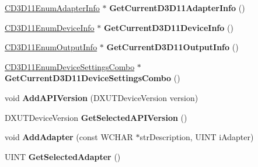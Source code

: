\begin{DoxyCompactItemize}
\item 
\hypertarget{class_c_d3_d_settings_dlg_aa55218dad61ba0dff3180137c9debe5e}{\hyperlink{class_c_d3_d11_enum_adapter_info}{C\+D3\+D11\+Enum\+Adapter\+Info} $\ast$ {\bfseries Get\+Current\+D3\+D11\+Adapter\+Info} ()}\label{class_c_d3_d_settings_dlg_aa55218dad61ba0dff3180137c9debe5e}

\item 
\hypertarget{class_c_d3_d_settings_dlg_a0d7b03493d86c5942b4547979580a557}{\hyperlink{class_c_d3_d11_enum_device_info}{C\+D3\+D11\+Enum\+Device\+Info} $\ast$ {\bfseries Get\+Current\+D3\+D11\+Device\+Info} ()}\label{class_c_d3_d_settings_dlg_a0d7b03493d86c5942b4547979580a557}

\item 
\hypertarget{class_c_d3_d_settings_dlg_a915c73e860d5e7650a37b8248dcb55cd}{\hyperlink{class_c_d3_d11_enum_output_info}{C\+D3\+D11\+Enum\+Output\+Info} $\ast$ {\bfseries Get\+Current\+D3\+D11\+Output\+Info} ()}\label{class_c_d3_d_settings_dlg_a915c73e860d5e7650a37b8248dcb55cd}

\item 
\hypertarget{class_c_d3_d_settings_dlg_a093073dc838cafa734db0293b5ca4283}{\hyperlink{struct_c_d3_d11_enum_device_settings_combo}{C\+D3\+D11\+Enum\+Device\+Settings\+Combo} $\ast$ {\bfseries Get\+Current\+D3\+D11\+Device\+Settings\+Combo} ()}\label{class_c_d3_d_settings_dlg_a093073dc838cafa734db0293b5ca4283}

\item 
\hypertarget{class_c_d3_d_settings_dlg_ab0c7edad9d7414f9cd4da29b4f7a0668}{void {\bfseries Add\+A\+P\+I\+Version} (D\+X\+U\+T\+Device\+Version version)}\label{class_c_d3_d_settings_dlg_ab0c7edad9d7414f9cd4da29b4f7a0668}

\item 
\hypertarget{class_c_d3_d_settings_dlg_a9ad88251ae426f85a48381cdf856b2d4}{D\+X\+U\+T\+Device\+Version {\bfseries Get\+Selected\+A\+P\+I\+Version} ()}\label{class_c_d3_d_settings_dlg_a9ad88251ae426f85a48381cdf856b2d4}

\item 
\hypertarget{class_c_d3_d_settings_dlg_af6f11fa22d6c9855beec1de19555df70}{void {\bfseries Add\+Adapter} (const W\+C\+H\+A\+R $\ast$str\+Description, U\+I\+N\+T i\+Adapter)}\label{class_c_d3_d_settings_dlg_af6f11fa22d6c9855beec1de19555df70}

\item 
\hypertarget{class_c_d3_d_settings_dlg_a7e286e6a7739042c63717a2009f72a64}{U\+I\+N\+T {\bfseries Get\+Selected\+Adapter} ()}\label{class_c_d3_d_settings_dlg_a7e286e6a7739042c63717a2009f72a64}


\end{DoxyCompactItemize}
